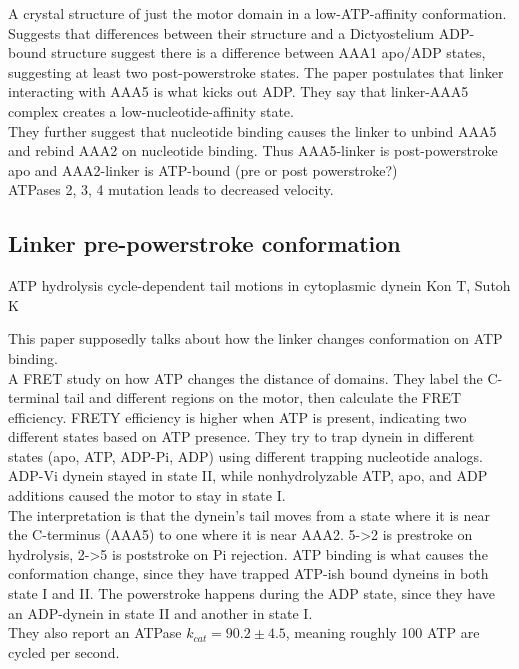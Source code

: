 \documentclass[10pt]{article} %
\begin{document}
A crystal structure of just the motor domain in a low-ATP-affinity conformation. Suggests that differences between their structure and a Dictyostelium ADP-bound structure suggest there is a difference between AAA1 apo/ADP states, suggesting at least two post-powerstroke states. The paper postulates that linker interacting with AAA5 is what kicks out ADP. They say that linker-AAA5 complex creates a low-nucleotide-affinity state.\\

They further suggest that nucleotide binding causes the linker to unbind AAA5 and rebind AAA2 on nucleotide binding. Thus AAA5-linker is post-powerstroke apo and AAA2-linker is ATP-bound (pre or post powerstroke?)\\

ATPases 2, 3, 4 mutation leads to decreased velocity.\\

\subsection{Linker pre-powerstroke conformation}
ATP hydrolysis cycle-dependent tail motions in cytoplasmic dynein
Kon T, Sutoh K

This paper supposedly talks about how the linker changes conformation on ATP binding.\\

A FRET study on how ATP changes the distance of domains. They label the C-terminal tail and different regions on the motor, then calculate the FRET efficiency. FRETY efficiency is higher when ATP is present, indicating two different states based on ATP presence. They try to trap dynein in different states (apo, ATP, ADP-Pi, ADP) using different trapping nucleotide analogs. ADP-Vi dynein stayed in state II, while nonhydrolyzable ATP, apo, and ADP additions caused the motor to stay in state I.\\

The interpretation is that the dynein's tail moves from a state where it is near the C-terminus (AAA5) to one where it is near AAA2. 5->2 is prestroke on hydrolysis, 2->5 is poststroke on Pi rejection. ATP binding is what causes the conformation change, since they have trapped ATP-ish bound dyneins in both state I and II. The powerstroke happens during the ADP state, since they have an ADP-dynein in state II and another in state I.\\

They also report an ATPase $k_{cat} = 90.2 \pm 4.5$, meaning roughly 100 ATP are cycled per second.\\
\end{document}
